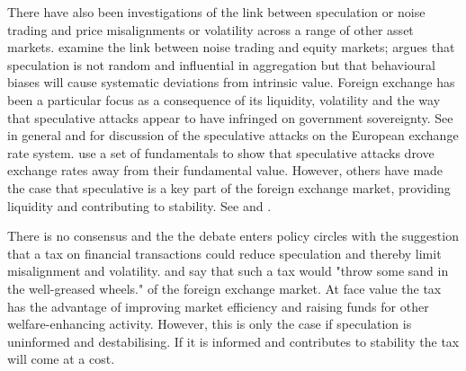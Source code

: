 \documentclass[ijfs,article,submit,oneauthor,pdftex,10pt,a4paper]{mdpi}
\begin{document}
{There have also been investigations of the link between speculation or noise trading and price misalignments or volatility across a range of other asset markets.  \citet{Verma} examine the link between noise trading and equity markets; \citet{Hongjun} argues that speculation is not random and influential in aggregation but that behavioural biases will cause systematic deviations from intrinsic value. Foreign exchange has been a particular focus as a consequence of its liquidity, volatility and the way that speculative attacks appear to have infringed on government sovereignty.  See \citet{Dornbusch1988} in general and \citet{Eichengreen1988} for discussion of the speculative attacks on the European exchange rate system.  \citet{Eichengreen1994} use a set of fundamentals to show that speculative attacks drove exchange rates away from their fundamental value. However, others have made the case that speculative is a key part of the foreign exchange market, providing liquidity and contributing to stability.  See \citet{Mayer1985} and \citet{McKinnon1986}.   

There is no consensus and the the debate enters policy circles with the suggestion that a tax on financial transactions could reduce speculation and thereby limit misalignment and volatility. \citet[pp.158]{TobinTax} and \citet{Tobin1988a} say that such a tax would "throw some sand in the well-greased wheels." of the foreign exchange market. At face value the tax has the advantage of improving market efficiency and raising funds for other welfare-enhancing activity.  However, this is only the case if speculation is uninformed and destabilising.  If it is informed and contributes to stability the tax will come at a cost.} 
\end{document}
